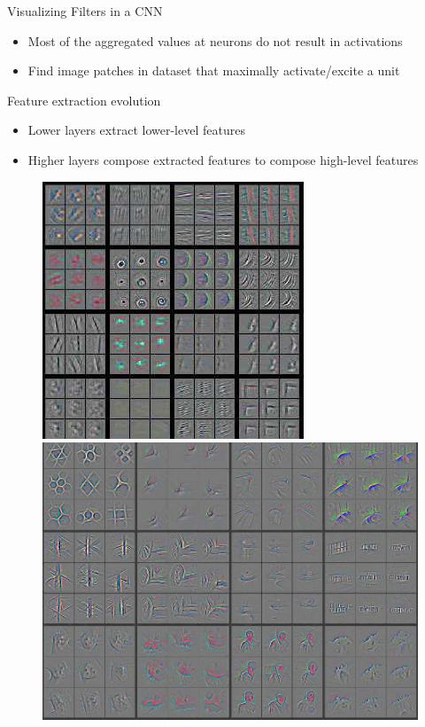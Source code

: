 \documentclass[aspectratio=169]{../latex_main/tntbeamer}
\begin{document}
\begin{frame}{Visualizing Filters in a CNN}
    \begin{itemize}
        \item Most of the aggregated values at neurons do not result in activations
        \item Find image patches in dataset that maximally activate/excite a unit
    \end{itemize}
    
\end{frame}

	
\begin{frame}{Feature extraction evolution}
    \begin{itemize}
        \item Lower layers extract lower-level features
        \item Higher layers compose extracted features to compose high-level features
    \end{itemize}
    \begin{figure}[h]
         \includegraphics[scale=.5]{img241}
         \centring
         \includegraphics[scale=.5]{img245}

\end{figure}
\end{frame}
\end{document}
